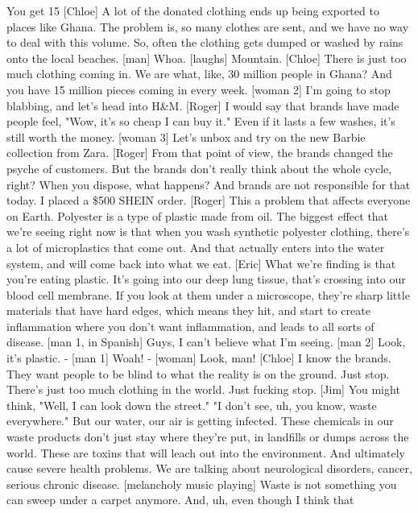 \documentclass[a4paper]{article}
\begin{document}
	You get 15%
	[Chloe] A lot of the donated clothing ends up being exported to places like Ghana.
	The problem is, so many clothes are sent,
	and we have no way to deal with this volume.
	So, often the clothing gets dumped or washed by rains
	onto the local beaches.
	[man] Whoa.
	[laughs]
	Mountain.
	[Chloe] There is just too much clothing coming in.
	We are what, like, 30 million people in Ghana?
	And you have 15 million pieces coming in every week.
	[woman 2] I'm going to stop blabbing, and let's head into H\&M.
	[Roger] I would say that brands have made people feel,
	"Wow, it's so cheap I can buy it."
	Even if it lasts a few washes, it's still worth the money.
	[woman 3] Let's unbox and try on the new Barbie collection from Zara.
	[Roger] From that point of view, the brands changed the psyche of customers.
	But the brands don't really think about the whole cycle, right?
	When you dispose, what happens?
	And brands are not responsible for that today.
	I placed a \$500 SHEIN order.
	[Roger] This a problem that affects everyone on Earth.
	Polyester is a type of plastic made from oil.
	The biggest effect that we're seeing right now
	is that when you wash synthetic polyester clothing,
	there's a lot of microplastics that come out.
	And that actually enters into the water system,
	and will come back into what we eat.
	[Eric] What we're finding is that you're eating plastic.
	It's going into our deep lung tissue,
	that's crossing into our blood cell membrane.
	If you look at them under a microscope, they're sharp little materials
	that have hard edges, which means they hit,
	and start to create inflammation where you don't want inflammation,
	and leads to all sorts of disease.
	[man 1, in Spanish] Guys, I can't believe what I'm seeing.
	[man 2] Look, it's plastic.
	- [man 1] Woah! - [woman] Look, man!
	[Chloe] I know the brands. They want people to be blind to
	what the reality is on the ground.
	Just stop. There's just too much clothing in the world.
	Just fucking stop.
	[Jim] You might think, "Well, I can look down the street."
	"I don't see, uh, you know, waste everywhere."
	But our water, our air is getting infected.
	These chemicals in our waste products
	don't just stay where they're put, in landfills or dumps across the world.
	These are toxins that will leach out into the environment.
	And ultimately cause severe health problems.
	We are talking about neurological disorders,
	cancer, serious chronic disease.
	[melancholy music playing]
	Waste is not something you can sweep under a carpet anymore.
	And, uh, even though I think that
\end{document}
